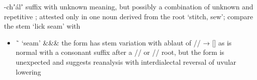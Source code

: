 \begin{morphdesc}[resume*=alphalist]
\item[-chʼálʼ]\label{m:-chʼálʼ}
	suffix with unknown meaning, but possibly a combination of unknown 
		and repetitive ;
	attested only in one noun derived from the root  ‘stitch, sew’;
	compare the stem  ‘lick seam’ with 
	\begin{itemize}
	\item	{} \~\  ‘seam’
			{&\·&\·&\·}
		\newline
		the form  has  stem variation
			with ablaut of // → [] as is normal with a consonant suffix
			after a // or // root,
		but the form  is unexpected and suggests reanalysis
			with interdialectal reversal of uvular lowering
	\end{itemize}


\end{morphdesc}
